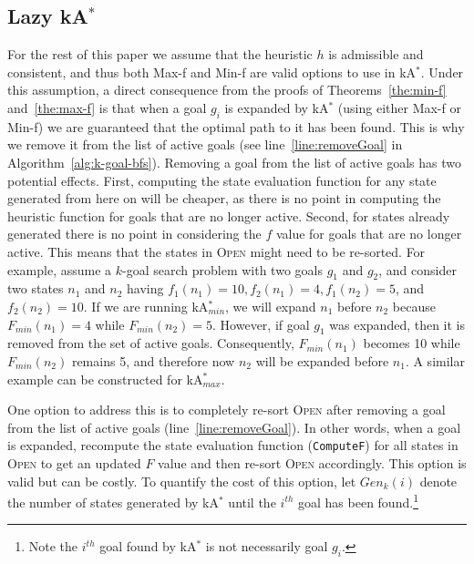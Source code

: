 \documentclass{aicom2e}
\newcommand{\kgs}{$k$-goal search}
\newcommand{\kastar}{kA$^*$}
\newcommand{\kastarmin}{kA$^*_{min}$}
\newcommand{\kastarmax}{kA$^*_{max}$}
\newcommand{\minf}{Min-f}
\newcommand{\maxf}{Max-f}
\newcommand{\open}{\textsc{Open}}
\begin{document}
\subsection{Lazy \kastar{}}
\label{sec:lazy}

For the rest of this paper we assume that the heuristic $h$ is admissible and consistent, and thus both \maxf{} and \minf{} are valid options to use in \kastar{}. Under this assumption, a direct consequence from the proofs of Theorems~\ref{the:min-f} and~\ref{the:max-f} is that when a goal $g_i$ is expanded by \kastar{} (using either \maxf{} or \minf{}) we are guaranteed that the optimal path to it has been found. This is why we remove it from the list of active goals (see line~\ref{line:removeGoal} in Algorithm~\ref{alg:k-goal-bfs}). Removing a goal from the list of active goals has two potential effects. First, computing the state evaluation function for any state generated from here on will be cheaper, as there is no point in computing the heuristic function for goals that are no longer active. Second, for states already generated there is no point in considering the $f$ value for goals that are no longer active. This means that the states in \open{} might need to be re-sorted. For example, assume a \kgs{} problem with two goals $g_1$ and $g_2$, and consider two states $n_1$ and $n_2$ having $f_1(n_1)=10, f_2(n_1)=4, f_1(n_2)=5$, and $f_2(n_2)=10$. If we are running \kastarmin{}, we will expand $n_1$ before $n_2$ because $F_{min}(n_1)=4$ while $F_{min}(n_2)=5$. However, if goal $g_1$ was expanded, then it is removed from the set of active goals. Consequently, $F_{min}(n_1)$ becomes 10 while $F_{min}(n_2)$ remains 5, and therefore now $n_2$ will be expanded before $n_1$. A similar example can be constructed for \kastarmax{}.



One option to address this is to completely re-sort \open{} after removing a goal from the list of active goals (line~\ref{line:removeGoal}). 
In other words, when a goal is expanded, recompute the state evaluation function ({\tt ComputeF}) for all states in \open{} to get an updated $F$ value and then  re-sort \open{} accordingly. 
This option is valid but can be costly. To quantify the cost of this option, 
let $Gen_k(i)$ denote the number of states generated by \kastar{} until the $i^{th}$ goal has been found.\footnote{Note the $i^{th}$ goal found by \kastar{} is not necessarily goal $g_i$.} 
\end{document}

